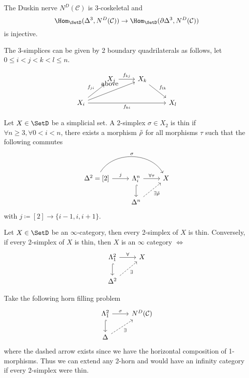 \begin{cor}
	The Duskin nerve $ N^D ( \mathcal{ C } ) $ is 3-coskeletal and 
	\[
	 	\Hom_{ \SetD } ( \Delta^3 , N^D ( \mathcal{ C } ) ) \to \Hom_{ \SetD } ( \partial \Delta^3 , N^D ( \mathcal{ C } ) ) 
	\]
  	is injective.
\end{cor}

The 3-simplices can be given by 2 boundary quadrilaterals as follows, let $ 0 \leq i < j < k < l \leq n $.

\[
\begin{tikzcd}
	&
	X_j
	\ar[r , " f_{ k j } " ]
	&
	X_k
	\ar[rd, "f_{ l k } "]
	\\
	X_i
	\arrow{rru}[name=U',label=above]{}
	\ar[ru, " f_{ j i } " ]
	\ar[rrr, " f_{ k i } "']
	&&&
	X_l
\end{tikzcd}
\]

\begin{defi}
	Let $ X \in \SetD $ be a simplicial set. 
	A 2-simplex $ \sigma \in X_2 $ is thin if $ \forall n \geq 3, \forall 0 < i < n $, there exists 
	a morphism $ \Tilde{ \rho } $ for all morphisms $ \tau $ such that the following commutes
	\[
	\begin{tikzcd}
		\Delta^2 = [ 2 ] 
		\ar[r, " j "]
		\ar[rr, bend left = 60, " \sigma "]
		&
		\Lambda_i^n
		\ar[r, " \forall \tau"]
		\ar[d, hook]
		&
		X
		\\
		&
		\Delta^n 
		\ar[ru, dashed, "\exists \Tilde{\rho}"']
	\end{tikzcd}
	\] 	
	with $ j \coloneqq [ 2 ] \to \{ i -1 , i , i + 1 \} $.
\end{defi}

\begin{rmk}
\label{every_simplex_thin}
	Let $ X \in \SetD $ be an $ \infty $-category, then every 2-simplex of $ X $ is thin.
	Conversely, if every 2-simplex of $ X $ is thin, then $ X $ is an $ \infty $ category $\iff$
	\[
	\begin{tikzcd}
		\Lambda_1^2 
		\ar[r, " \forall"]
		\ar[d, hook]
		&
		X
		\\
		\Delta^2
		\ar[ru, dashed, "\exists"']
	\end{tikzcd}
	\]
\end{rmk}

\begin{rmk}
\label{remark_thin_Duskin}
	Take the following horn filling problem
	\[
	\begin{tikzcd}
		\Lambda_1^2
		\ar[r, " \sigma "]
		\ar[d, hook]
		&
		N^D ( \mathcal{ C } )
		\\
		\Delta
		\ar[ru, dashed, "\exists"']
	\end{tikzcd}
	\]
	where the dashed arrow exists since we have the horizontal composition of 1-morphisms.
	Thus we can extend any 2-horn and would have an infinity category if every 2-simplex were thin.
\end{rmk}

